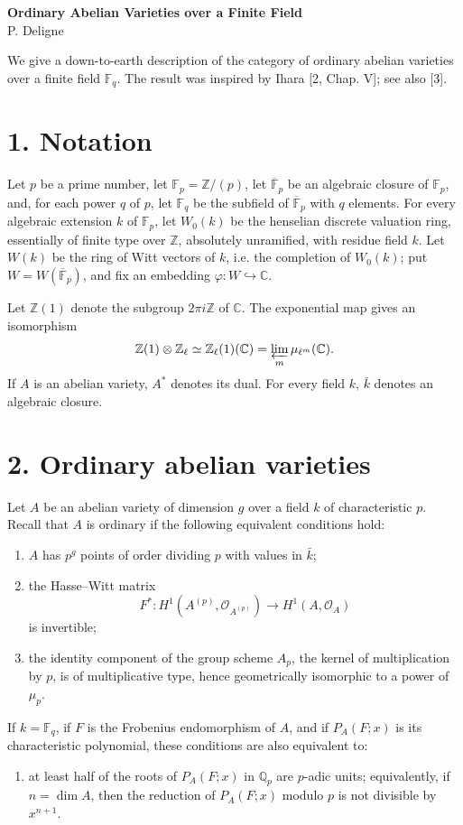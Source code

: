 \documentclass[12pt]{article}
\newcommand{\Z}{\mathbb{Z}}
\newcommand{\Q}{\mathbb{Q}}
\newcommand{\C}{\mathbb{C}}
\newcommand{\F}{\mathbb{F}}
\newcommand{\calO}{\mathcal{O}}
\theoremstyle{plain}
\theoremstyle{definition}
\theoremstyle{remark}
\begin{document}
\begin{center}
{\Large\bfseries Ordinary Abelian Varieties over a Finite Field}\\[0.8em]
{\large P. Deligne}
\end{center}
\vspace{1em}

We give a down-to-earth description of the category of ordinary abelian varieties over a finite field $\F_q$. The result was inspired by Ihara [2, Chap. V]; see also [3].

\section*{1. Notation}
Let $p$ be a prime number, let $\F_p=\Z/(p)$, let $\overline{\F}_p$ be an algebraic closure of $\F_p$, and, for each power $q$ of $p$, let $\F_q$ be the subfield of $\overline{\F}_p$ with $q$ elements. For every algebraic extension $k$ of $\F_p$, let $W_0(k)$ be the henselian discrete valuation ring, essentially of finite type over $\Z$, absolutely unramified, with residue field $k$. Let $W(k)$ be the ring of Witt vectors of $k$, i.e. the completion of $W_0(k)$; put $W=W(\overline{\F}_p)$, and fix an embedding $\varphi:W\hookrightarrow\C$.

Let $\Z(1)$ denote the subgroup $2\pi i\Z$ of $\C$. The exponential map gives an isomorphism
\[
 \Z(1)\otimes\Z_\ell \simeq \Z_\ell(1)(\C)=\varprojlim_m \mu_{\ell^m}(\C).
\]
If $A$ is an abelian variety, $A^*$ denotes its dual. For every field $k$, $\bar k$ denotes an algebraic closure.

\section*{2. Ordinary abelian varieties}
Let $A$ be an abelian variety of dimension $g$ over a field $k$ of characteristic $p$. Recall that $A$ is ordinary if the following equivalent conditions hold:
\begin{enumerate}[label=(\Roman*)]
\item $A$ has $p^g$ points of order dividing $p$ with values in $\bar k$;
\item the Hasse--Witt matrix
\[
 F^*:H^1(A^{(p)},\calO_{A^{(p)}})\longrightarrow H^1(A,\calO_A)
\]
is invertible;
\item the identity component of the group scheme $A_p$, the kernel of multiplication by $p$, is of multiplicative type, hence geometrically isomorphic to a power of $\mu_p$.
\end{enumerate}
If $k=\F_q$, if $F$ is the Frobenius endomorphism of $A$, and if $P_A(F;x)$ is its characteristic polynomial, these conditions are also equivalent to:
\begin{enumerate}[label=(\Roman*),start=4]
\item at least half of the roots of $P_A(F;x)$ in $\Q_p$ are $p$-adic units; equivalently, if $n=\dim A$, then the reduction of $P_A(F;x)$ modulo $p$ is not divisible by $x^{n+1}$.
\end{enumerate}
\end{document}
